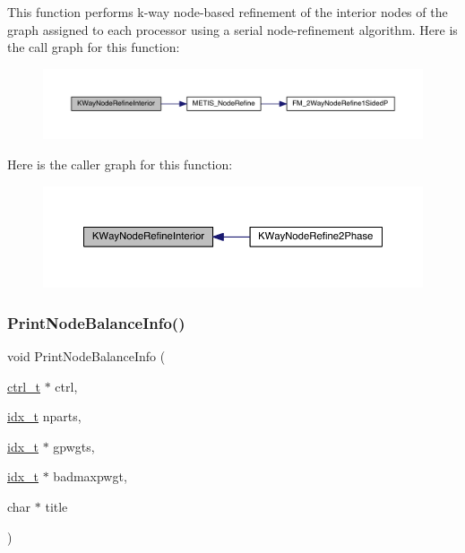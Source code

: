 This function performs k-\/way node-\/based refinement of the interior nodes of the graph assigned to each processor using a serial node-\/refinement algorithm. Here is the call graph for this function\+:\nopagebreak
\begin{figure}[H]
\begin{center}
\leavevmode
\includegraphics[width=350pt]{a00383_ad38351510bbf07393425b90ea3c4f5bd_cgraph}
\end{center}
\end{figure}
Here is the caller graph for this function\+:\nopagebreak
\begin{figure}[H]
\begin{center}
\leavevmode
\includegraphics[width=350pt]{a00383_ad38351510bbf07393425b90ea3c4f5bd_icgraph}
\end{center}
\end{figure}
\mbox{\label{a00383_a209dbc8b8ae14de6f02ff22f00a60d3c}} 
\subsubsection{\texorpdfstring{Print\+Node\+Balance\+Info()}{PrintNodeBalanceInfo()}}
{\footnotesize\ttfamily void Print\+Node\+Balance\+Info (\begin{DoxyParamCaption}\item[{\hyperlink{a00742}{ctrl\+\_\+t} $\ast$}]{ctrl,  }\item[{\hyperlink{a00876_aaa5262be3e700770163401acb0150f52}{idx\+\_\+t}}]{nparts,  }\item[{\hyperlink{a00876_aaa5262be3e700770163401acb0150f52}{idx\+\_\+t} $\ast$}]{gpwgts,  }\item[{\hyperlink{a00876_aaa5262be3e700770163401acb0150f52}{idx\+\_\+t} $\ast$}]{badmaxpwgt,  }\item[{char $\ast$}]{title }\end{DoxyParamCaption})}

